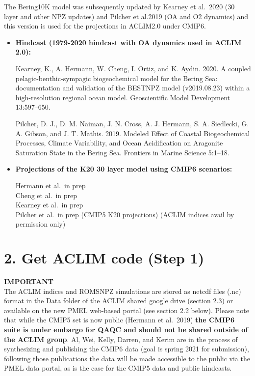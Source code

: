 \documentclass[
]{article}
\begin{document}
The Bering10K model was subsequently updated by Kearney et al.~2020 (30
layer and other NPZ updates) and Pilcher et al.2019 (OA and O2 dynamics)
and this version is used for the projections in ACLIM2.0 under CMIP6.

\begin{itemize}
\item
  \textbf{Hindcast (1979-2020 hindcast with OA dynamics used in ACLIM
  2.0):}

  Kearney, K., A. Hermann, W. Cheng, I. Ortiz, and K. Aydin. 2020. A
  coupled pelagic-benthic-sympagic biogeochemical model for the Bering
  Sea: documentation and validation of the BESTNPZ model (v2019.08.23)
  within a high-resolution regional ocean model. Geoscientific Model
  Development 13:597--650.

  Pilcher, D. J., D. M. Naiman, J. N. Cross, A. J. Hermann, S. A.
  Siedlecki, G. A. Gibson, and J. T. Mathis. 2019. Modeled Effect of
  Coastal Biogeochemical Processes, Climate Variability, and Ocean
  Acidification on Aragonite Saturation State in the Bering Sea.
  Frontiers in Marine Science 5:1--18.
\item
  \textbf{Projections of the K20 30 layer model using CMIP6 scenarios:}

  Hermann et al.~in prep\\
  Cheng et al.~in prep\\
  Kearney et al.~in prep\\
  Pilcher et al.~in prep (CMIP5 K20 projections) (ACLIM indices avail by
  permission only)
\end{itemize}

\hypertarget{get-aclim-code-step-1}{%
\section{2. Get ACLIM code (Step 1)}\label{get-aclim-code-step-1}}

\textbf{IMPORTANT}\\
The ACLIM indices and ROMSNPZ simulations are stored as netcdf files
(.nc) format in the Data folder of the ACLIM shared google drive
(section 2.3) or available on the new PMEL web-based portal (see section
2.2 below). Please note that while the CMIP5 set is now public (Hermann
et al.~2019) \textbf{the CMIP6 suite is under embargo for QAQC and
should not be shared outside of the ACLIM group}. Al, Wei, Kelly,
Darren, and Kerim are in the process of synthesizing and publishing the
CMIP6 data (goal is spring 2021 for submission), following those
publications the data will be made accessible to the public via the PMEL
data portal, as is the case for the CMIP5 data and public hindcasts.
\end{document}
